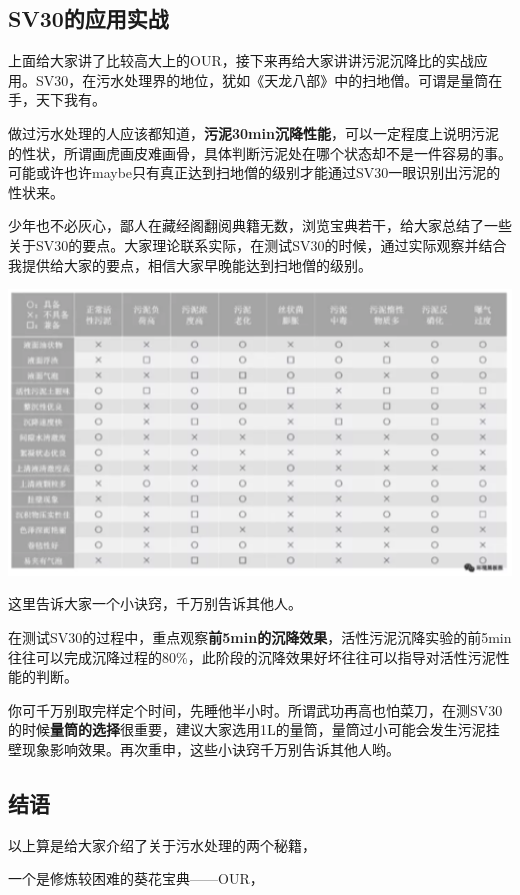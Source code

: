 \documentclass[]{book}
\begin{document}
\subsection{SV30的应用实战}\label{sv30}

上面给大家讲了比较高大上的OUR，接下来再给大家讲讲污泥沉降比的实战应用。SV30，在污水处理界的地位，犹如《天龙八部》中的扫地僧。可谓是量筒在手，天下我有。

做过污水处理的人应该都知道，\textbf{污泥30min沉降性能}，可以一定程度上说明污泥的性状，所谓画虎画皮难画骨，具体判断污泥处在哪个状态却不是一件容易的事。可能或许也许maybe只有真正达到扫地僧的级别才能通过SV30一眼识别出污泥的性状来。

少年也不必灰心，鄙人在藏经阁翻阅典籍无数，浏览宝典若干，给大家总结了一些关于SV30的要点。大家理论联系实际，在测试SV30的时候，通过实际观察并结合我提供给大家的要点，相信大家早晚能达到扫地僧的级别。

\includegraphics[width=6.67in]{images/os3}

这里告诉大家一个小诀窍，千万别告诉其他人。

在测试SV30的过程中，重点观察\textbf{前5min的沉降效果}，活性污泥沉降实验的前5min往往可以完成沉降过程的80\%，此阶段的沉降效果好坏往往可以指导对活性污泥性能的判断。

你可千万别取完样定个时间，先睡他半小时。所谓武功再高也怕菜刀，在测SV30的时候\textbf{量筒的选择}很重要，建议大家选用1L的量筒，量筒过小可能会发生污泥挂壁现象影响效果。再次重申，这些小诀窍千万别告诉其他人哟。

\subsection{结语}\label{-2}

以上算是给大家介绍了关于污水处理的两个秘籍，

一个是修炼较困难的葵花宝典------OUR，
\end{document}
